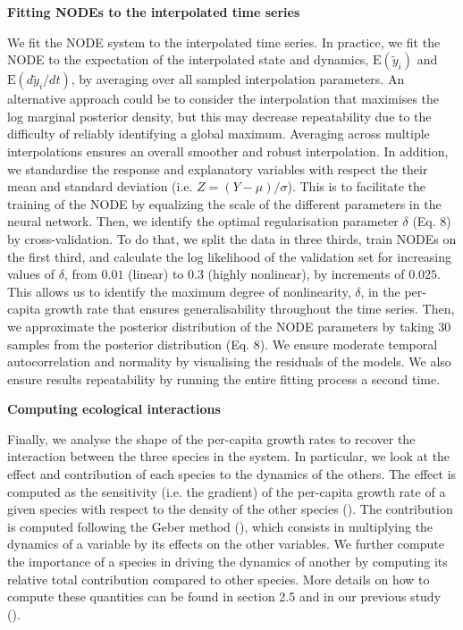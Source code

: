 \documentclass[11pt, oneside]{article}
\begin{document}
\textbf{Fitting NODEs to the interpolated time series}

We fit the NODE system to the interpolated time series.
In practice, we fit the NODE to the expectation of the interpolated state and dynamics, $\mathrm{E}(\tilde{y}_i)$ and $\mathrm{E}(d\tilde{y}_i/dt)$, by averaging over all sampled interpolation parameters.
An alternative approach could be to consider the interpolation that maximises the log marginal posterior density, but this may decrease repeatability due to the difficulty of reliably identifying a global maximum.
Averaging across multiple interpolations ensures an overall smoother and robust interpolation. 
In addition, we standardise the response and explanatory variables with respect the their mean and standard deviation (i.e. $Z=(Y-\mu)/\sigma$).
This is to facilitate the training of the NODE by equalizing the scale of the different parameters in the neural network.
Then, we identify the optimal regularisation parameter $\delta$ (Eq. 8) by cross-validation.
To do that, we split the data in three thirds, train NODEs on the first third, and calculate the log likelihood of the validation set for increasing values of $\delta$, from $0.01$ (linear) to $0.3$ (highly nonlinear), by increments of $0.025$.
This allows us to identify the maximum degree of nonlinearity, $\delta$, in the per-capita growth rate that ensures generalisability throughout the time series.
Then, we approximate the posterior distribution of the NODE parameters by taking 30 samples from the posterior distribution (Eq. 8).
We ensure moderate temporal autocorrelation and normality by visualising the residuals of the models.
We also ensure results repeatability by running the entire fitting process a second time.

\textbf{Computing ecological interactions}

Finally, we analyse the shape of the per-capita growth rates to recover the interaction between the three species in the system.
In particular, we look at the effect and contribution of each species to the dynamics of the others.
The effect is computed as the sensitivity (i.e. the gradient) of the per-capita growth rate of a given species with respect to the density of the other species (\cite{Sugihara2012,Bonnaffe2021a}).
The contribution is computed following the Geber method (\cite{Hairston2005}), which consists in multiplying the dynamics of a variable by its effects on the other variables.
We further compute the importance of a species in driving the dynamics of another by computing its relative total contribution compared to other species.
More details on how to compute these quantities can be found in section 2.5 and in our previous study (\cite{Bonnaffe2021a}).
\end{document}
